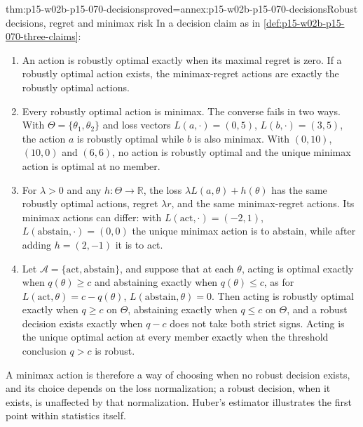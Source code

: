 \begin{hbtheorem}{thm:p15-w02b-p15-070-decisions}{proved=annex:p15-w02b-p15-070-decisions}{Robust decisions, regret and minimax risk}
In a decision claim as in \cref{def:p15-w02b-p15-070-three-claims}:
\begin{enumerate}
\item An action is robustly optimal exactly when its maximal regret is
      zero. If a robustly optimal action exists, the minimax-regret
      actions are exactly the robustly optimal actions.
\item Every robustly optimal action is minimax. The converse fails in two
      ways. With \(\Theta=\{\theta_1,\theta_2\}\) and loss vectors
      \(L(a,\cdot)=(0,5)\), \(L(b,\cdot)=(3,5)\), the action \(a\) is
      robustly optimal while \(b\) is also minimax. With
      \((0,10)\), \((10,0)\) and \((6,6)\), no action is robustly
      optimal and the unique minimax action is optimal at no member.
\item For \(\lambda>0\) and any \(h:\Theta\to\mathbb R\), the loss
      \(\lambda L(a,\theta)+h(\theta)\) has the same robustly optimal
      actions, regret \(\lambda r\), and the same minimax-regret actions.
      Its minimax actions can differ: with
      \(L(\mathrm{act},\cdot)=(-2,1)\), \(L(\mathrm{abstain},\cdot)=(0,0)\)
      the unique minimax action is to abstain, while after adding
      \(h=(2,-1)\) it is to act.
\item Let \(\mathcal A=\{\mathrm{act},\mathrm{abstain}\}\), and suppose
      that at each \(\theta\), acting is optimal exactly when
      \(q(\theta)\geq c\) and abstaining exactly when \(q(\theta)\leq c\),
      as for \(L(\mathrm{act},\theta)=c-q(\theta)\),
      \(L(\mathrm{abstain},\theta)=0\). Then acting is robustly optimal
      exactly when \(q\geq c\) on \(\Theta\), abstaining exactly when
      \(q\leq c\) on \(\Theta\), and a robust decision exists exactly when
      \(q-c\) does not take both strict signs. Acting is the unique
      optimal action at every member exactly when the threshold
      conclusion \(q>c\) is robust.
\end{enumerate}
\end{hbtheorem}

A minimax action is therefore a way of choosing when no robust decision
exists, and its choice depends on the loss normalization; a robust
decision, when it exists, is unaffected by that normalization.
Huber's estimator illustrates the first point within statistics itself.

